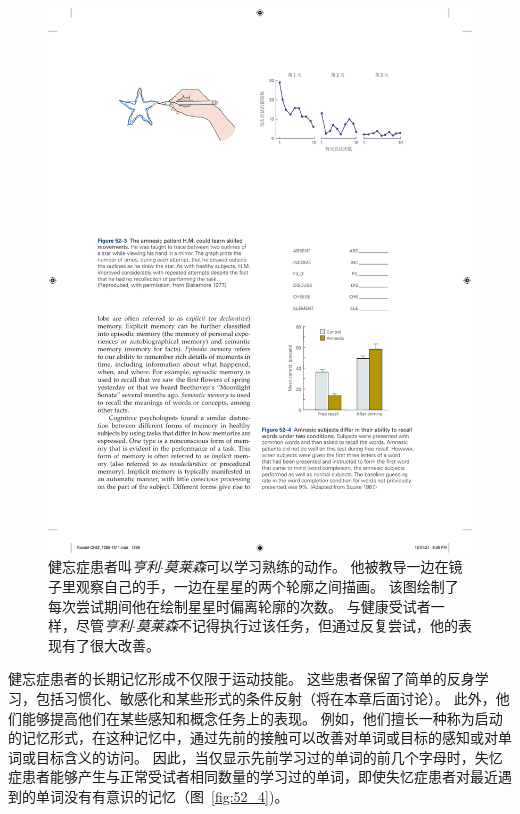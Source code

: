 \begin{figure}[htbp]
	\centering
	\includegraphics[width=1.0\linewidth]{chap52/fig_52_3}
	\caption{健忘症患者叫\textit{亨利$\cdot$莫莱森}可以学习熟练的动作。
		他被教导一边在镜子里观察自己的手，一边在星星的两个轮廓之间描画。
		该图绘制了每次尝试期间他在绘制星星时偏离轮廓的次数。
		与健康受试者一样，尽管\textit{亨利$\cdot$莫莱森}不记得执行过该任务，但通过反复尝试，他的表现有了很大改善\cite{blakemore1977mechanics}。}
	\label{fig:52_3}
\end{figure}


健忘症患者的长期记忆形成不仅限于运动技能。
这些患者保留了简单的反身学习，包括习惯化、敏感化和某些形式的条件反射（将在本章后面讨论）。
此外，他们能够提高他们在某些感知和概念任务上的表现。
例如，他们擅长一种称为启动的记忆形式，在这种记忆中，通过先前的接触可以改善对单词或目标的感知或对单词或目标含义的访问。
因此，当仅显示先前学习过的单词的前几个字母时，失忆症患者能够产生与正常受试者相同数量的学习过的单词，即使失忆症患者对最近遇到的单词没有有意识的记忆（图~\ref{fig:52_4})。


